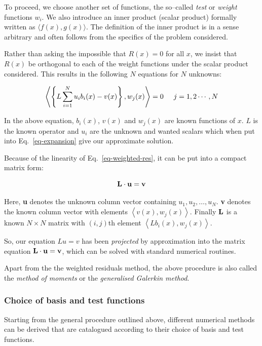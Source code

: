 To proceed, we choose another set of functions, the so--called \emph{test} or \emph{weight} functions $w_i$. We also introduce an inner product (scalar product) formally written as $\langle f(x),g(x) \rangle$. The definition of the inner product is in a sense arbitrary and often follows from the specifics of the problem considered.

Rather than asking the impossible that $R(x)=0$ for all $x$, we insist that $R(x)$ be orthogonal to each of the weight functions under the scalar product considered. This results in the following $N$ equations for $N$ unknowns:

\begin{equation}
\left\langle \left\{ L \sum_{i=1}^N u_i b_i(x) - v(x)  \right\}, w_j(x) \right\rangle = 0 \hspace{0.5cm} j=1,2\cdots,N \label{eq-weighted-res}
\end{equation}

In the above equation, $b_i(x)$, $v(x)$ and $w_j(x)$ are known functions of $x$. $L$ is the known operator and $u_i$ are the unknown and wanted scalars which when put into Eq.~\ref{eq-expansion} give our approximate solution.

Because of the linearity of Eq.~\ref{eq-weighted-res}, it can be put into a compact matrix form:

\begin{equation}
{\bf L} \cdot {\bf u} = {\bf v}
\end{equation} 

Here, {\bf u} denotes the unknown column vector containing $u_1, u_2, \hdots, u_N$. {\bf v} denotes the known column vector with elements $\left\langle v(x), w_j(x) \right\rangle$. Finally ${\bf L}$ is a known $N \times N$ matrix with $(i,j)$th element $\left\langle L b_i(x), w_j(x) \right\rangle$.

So, our equation $Lu=v$ has been \emph{projected} by approximation into the matrix equation ${\bf L} \cdot {\bf u} = {\bf v}$, which can be solved with standard numerical routines.

Apart from the the weighted residuals method, the above procedure is also called the \emph{method of moments} or the \emph{generalised Galerkin method}.

\subsubsection{Choice of basis and test functions}

Starting from the general procedure outlined above, different numerical methods can be derived that are catalogued according to their choice of basis and test functions.

